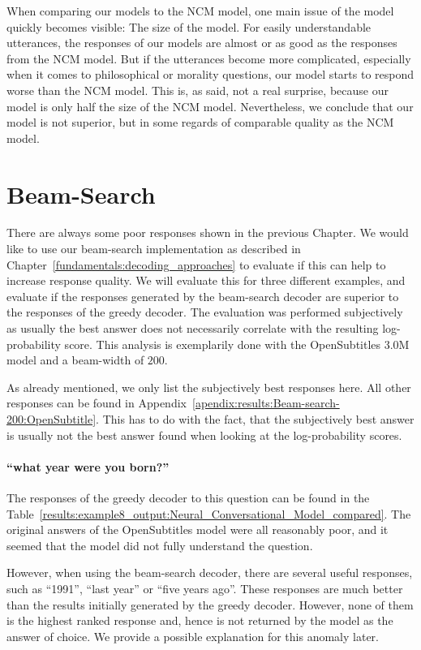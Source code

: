 When comparing our models to the NCM model, one main issue of the model quickly becomes visible: The size of the model. For easily understandable utterances, the responses of our models are almost or as good as the responses from the NCM model. But if the utterances become more complicated, especially when it comes to philosophical or morality questions, our model starts to respond worse than the NCM model. This is, as said, not a real surprise, because our model is only half the size of the NCM model. Nevertheless, we conclude that our model is not superior, but in some regards of comparable quality as the NCM model.

\section{Beam-Search}
\label{results:beam_search}
There are always some poor responses shown in the previous Chapter. We would like to use our beam-search implementation as described in Chapter~\ref{fundamentals:decoding_approaches} to evaluate if this can help to increase response quality. We will evaluate this for three different examples, and evaluate if the responses generated by the beam-search decoder are superior to the responses of the greedy decoder. The evaluation was performed subjectively as usually the best answer does not necessarily correlate with the resulting log-probability score. This analysis is exemplarily done with the OpenSubtitles 3.0M model and a beam-width of $200$.

As already mentioned, we only list the subjectively best responses here. All other responses can be found in Appendix~\ref{apendix:results:Beam-search-200:OpenSubtitle}. This has to do with the fact, that the subjectively best answer is usually not the best answer found when looking at the log-probability scores.

\paragraph{``what year were you born?''} The responses of the greedy decoder to this question can be found in the Table~\ref{results:example8_output:Neural_Conversational_Model_compared}. The original answers of the OpenSubtitles model were all reasonably poor, and it seemed that the model did not fully understand the question.

However, when using the beam-search decoder, there are several useful responses, such as ``1991'', ``last year'' or ``five years ago''. These responses are much better than the results initially generated by the greedy decoder. However, none of them is the highest ranked response and, hence is not returned by the model as the answer of choice. We provide a possible explanation for this anomaly later.

